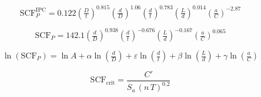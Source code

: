 \begin{equation}
\mathrm{SCF}_{P}^{\mathrm{IPC}} = 0.122
\left(\tfrac{D}{t}\right)^{0.815}
\left(\tfrac{d}{D}\right)^{1.06}
\left(\tfrac{d}{t}\right)^{0.783}
\left(\tfrac{L}{d}\right)^{0.014}
\left(\tfrac{a}{C}\right)^{-2.87}
\label{eq:ipc}
\end{equation}

\begin{equation}
\boxed{\;
\mathrm{SCF}_{P} = 142.1
\left(\tfrac{d}{D}\right)^{0.938}
\left(\tfrac{d}{t}\right)^{-0.676}
\left(\tfrac{L}{d}\right)^{-0.167}
\left(\tfrac{a}{C}\right)^{0.065}
\;}
\label{eq:ldscf}
\end{equation}

\begin{equation}
\ln(\mathrm{SCF}_{P}) = \ln A
+ \alpha \ln\!\left(\tfrac{d}{D}\right)
+ \varepsilon \ln\!\left(\tfrac{d}{t}\right)
+ \beta  \ln\!\left(\tfrac{L}{d}\right)
+ \gamma \ln\!\left(\tfrac{a}{C}\right)
\label{eq:loglinear}
\end{equation}

\begin{equation}
\boxed{\;
\mathrm{SCF}_{\mathrm{crit}} = \frac{C'}{S_{a}\,(n\,T)^{0.2}}
\;}
\label{eq:scf_crit}
\end{equation}
